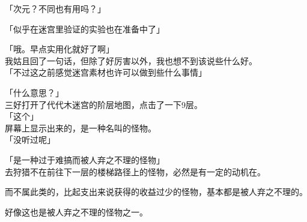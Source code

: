 「次元？不同也有用吗？」

「似乎在迷宫里验证的实验也在准备中了」

「哦。早点实用化就好了啊」\\

我姑且回了一句话，但除了好厉害以外，我也想不到该说些什么好。\\

「不过这之前感觉迷宫素材也许可以做到些什么事情」

「什么意思？」\\

三好打开了代代木迷宫的阶层地图，点击了一下9层。\\

「这个」\\

屏幕上显示出来的，是一种名叫的怪物。\\

「没听过呢」

「是一种过于难搞而被人弃之不理的怪物」\\

去狩猎不在前往下一层的楼梯路径上的怪物，必然是有一定的动机在。

而不属此类的，比起支出来说获得的收益过少的怪物，基本都是被人弃之不理的。

好像这也是被人弃之不理的怪物之一。\\

